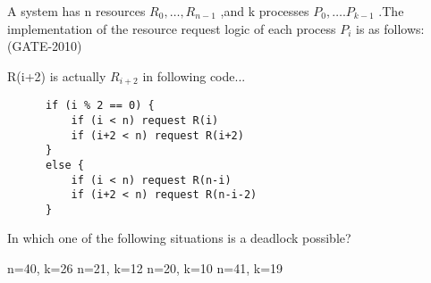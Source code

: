 \vspace{0.08in}


\begin{minipage}{\linewidth}

  \question  A system has n resources {\large \( { R_0,…,R_{n-1}  } \) },and k processes {\large \( { P_0,….P_{k-1} } \) } .The implementation of the resource request logic of each process \(P_i\) is as follows:  (GATE-2010)

  R(i+2) is actually \( R_{i+2} \) in following code...
  \begin{lstlisting}
      if (i % 2 == 0) {
          if (i < n) request R(i)
          if (i+2 < n) request R(i+2)
      }
      else {
          if (i < n) request R(n-i)
          if (i+2 < n) request R(n-i-2)
      }
  \end{lstlisting}

  In which one of the following situations is a deadlock possible?

  \begin{oneparchoices}
    \choice n=40, k=26
    \choice n=21, k=12
    \choice n=20, k=10
    \choice n=41, k=19
  \end{oneparchoices}

  \end{minipage}

\vspace{0.08in}


